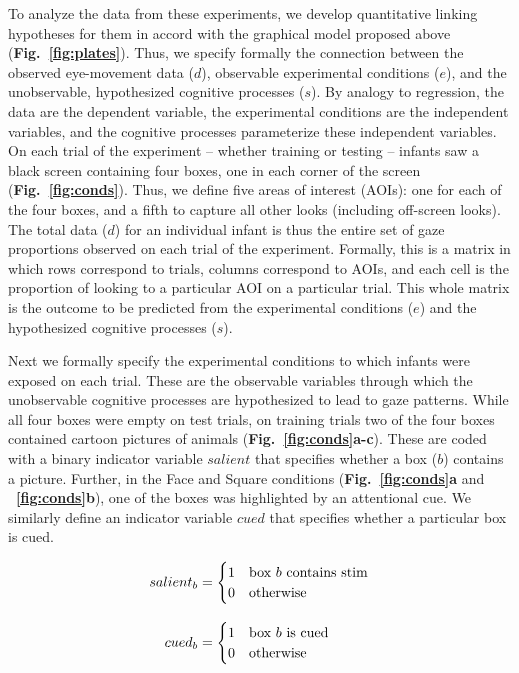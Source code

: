 \documentclass[12pt]{article}
\begin{document}
To analyze the data from these experiments, we develop quantitative linking hypotheses for them in accord with the graphical model proposed above (\textbf{Fig.~\ref{fig:plates}}). Thus, we specify formally the connection between the observed eye-movement data ($d$), observable experimental conditions ($e$), and the unobservable, hypothesized cognitive processes ($s$). By analogy to regression, the data are the dependent variable, the experimental conditions are the independent variables, and the cognitive processes parameterize these independent variables. On each trial of the experiment -- whether training or testing -- infants saw a black screen containing four boxes, one in each corner of the screen (\textbf{Fig.~\ref{fig:conds}}). Thus, we define five areas of interest (AOIs): one for each of the four boxes, and a fifth to capture all other looks (including off-screen looks). The total data ($d$) for an individual infant is thus the entire set of gaze proportions observed on each trial of the experiment. Formally, this is a matrix in which rows correspond to trials, columns correspond to AOIs, and each cell is the proportion of looking to a particular AOI on a particular trial. This whole matrix is the outcome to be predicted from the experimental conditions ($e$) and the hypothesized cognitive processes ($s$).

	Next we formally specify the experimental conditions to which infants were exposed on each trial. These are the observable variables through which the unobservable cognitive processes are hypothesized to lead to gaze patterns. While all four boxes were empty on test trials, on training trials two of the four boxes contained cartoon pictures of animals (\textbf{Fig.~\ref{fig:conds}a-c}). These are coded with a binary indicator variable $salient$ that specifies whether a box ($b$) contains a picture. Further, in the Face and Square conditions (\textbf{Fig.~\ref{fig:conds}a} and \textbf{~\ref{fig:conds}b}), one of the boxes was highlighted by an attentional cue. We similarly define an indicator variable $cued$ that specifies whether a particular box is cued.

\begin{equation}\label{eq:inds}
\setlength{\jot}{12pt}
\begin{aligned} 
salient_{b} &= \begin{cases} 1 & \text{box $b$ contains stim}\\
	0 &\text{otherwise}
	\end{cases}\\
cued_{b} &=\begin{cases} 1 & \text{box $b$ is cued}\\
	0 &\text{otherwise}
	\end{cases}\\
\end{aligned}
\end{equation}
\end{document}
